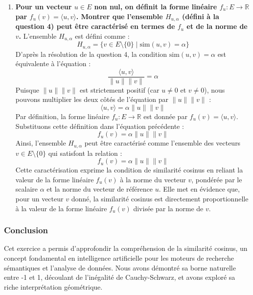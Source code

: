 \documentclass[11pt,a4paper]{report}
\begin{document}
\begin{enumerate}
\begin{itemize}
  \item
    Si \(n=1\), \(H_{u, \alpha} = \emptyset\).
  \item
    Si \(n=2\), \(H_{u, \alpha}\) est l'union de deux demi-droites
    distinctes issues de l'origine.
  \item
    Si \(n \ge 3\), \(H_{u, \alpha}\) est un cône de révolution d'axe
    \(\text{Vect}(u)\) et de demi-angle au sommet \(\arccos(\alpha)\),
    privé de son sommet (l'origine).
  \end{itemize}
\item
  \textbf{Pour un vecteur \(u \in E\) non nul, on définit la forme
  linéaire \(f_u: E \to \mathbb{R}\) par
  \(f_u(v) = \langle u, v \rangle\). Montrer que l'ensemble
  \(H_{u, \alpha}\) (défini à la question 4) peut être caractérisé en
  termes de \(f_u\) et de la norme de \(v\).} L'ensemble
  \(H_{u, \alpha}\) est défini comme :
  \[H_{u, \alpha} = \{v \in E \setminus \{0\} \mid \text{sim}(u, v) = \alpha\}\]
  D'après la résolution de la question 4, la condition
  \(\text{sim}(u, v) = \alpha\) est équivalente à l'équation :
  \[\frac{\langle u, v \rangle}{\|u\| \|v\|} = \alpha\] Puisque
  \(\|u\| \|v\|\) est strictement positif (car \(u \ne 0\) et
  \(v \ne 0\)), nous pouvons multiplier les deux côtés de l'équation par
  \(\|u\| \|v\|\) : \[\langle u, v \rangle = \alpha \|u\| \|v\|\] Par
  définition, la forme linéaire \(f_u: E \to \mathbb{R}\) est donnée par
  \(f_u(v) = \langle u, v \rangle\). Substituons cette définition dans
  l'équation précédente : \[f_u(v) = \alpha \|u\| \|v\|\] Ainsi,
  l'ensemble \(H_{u, \alpha}\) peut être caractérisé comme l'ensemble
  des vecteurs \(v \in E \setminus \{0\}\) qui satisfont la relation :
  \[f_u(v) = \alpha \|u\| \|v\|\] Cette caractérisation exprime la
  condition de similarité cosinus en reliant la valeur de la forme
  linéaire \(f_u(v)\) à la norme du vecteur \(v\), pondérée par le
  scalaire \(\alpha\) et la norme du vecteur de référence \(u\). Elle
  met en évidence que, pour un vecteur \(v\) donné, la similarité
  cosinus est directement proportionnelle à la valeur de la forme
  linéaire \(f_u(v)\) divisée par la norme de \(v\).
\end{enumerate}

\hypertarget{conclusion}{%
\subsubsection{Conclusion}\label{conclusion}}

Cet exercice a permis d'approfondir la compréhension de la similarité
cosinus, un concept fondamental en intelligence artificielle pour les
moteurs de recherche sémantiques et l'analyse de données. Nous avons
démontré sa borne naturelle entre -1 et 1, découlant de l'inégalité de
Cauchy-Schwarz, et avons exploré sa riche interprétation géométrique.
\end{document}
